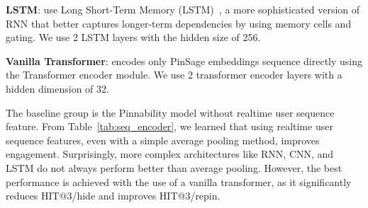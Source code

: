 \textbf{LSTM}: use Long Short-Term Memory (LSTM)~\cite{lstm}, a more sophisticated version of RNN that better captures longer-term dependencies by using memory cells and gating. We use 2 LSTM layers with the hidden size of 256.

\textbf{Vanilla Transformer}: encodes only PinSage embeddings sequence directly using the Transformer encoder module. We use 2 transformer encoder layers with a hidden dimension of 32.
 

The baseline group is the Pinnability model without realtime user sequence feature.
From Table~\ref{tab:seq_encoder}, we learned that using realtime user sequence features, even with a simple average pooling method, improves engagement. 
Surprisingly, more complex architectures like RNN, CNN, and LSTM do not always perform better than average pooling. However, the best performance is achieved with the use of a vanilla transformer, as it significantly reduces HIT@3/hide and improves HIT@3/repin.



